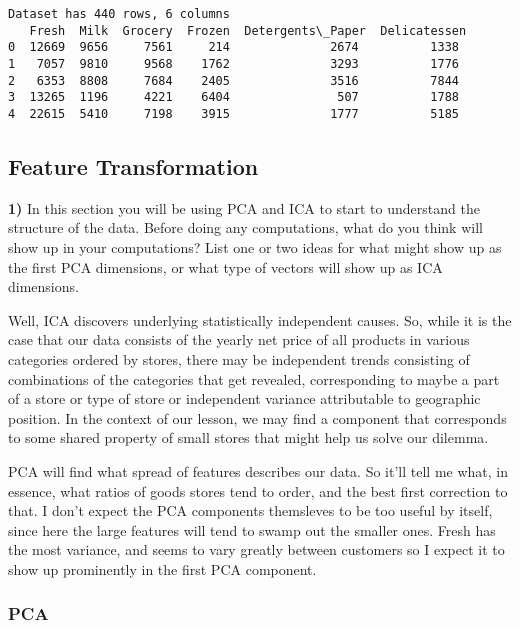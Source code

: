 \documentclass{article}
\begin{document}
    \begin{Verbatim}[commandchars=\\\{\}]
Dataset has 440 rows, 6 columns
   Fresh  Milk  Grocery  Frozen  Detergents\_Paper  Delicatessen
0  12669  9656     7561     214              2674          1338
1   7057  9810     9568    1762              3293          1776
2   6353  8808     7684    2405              3516          7844
3  13265  1196     4221    6404               507          1788
4  22615  5410     7198    3915              1777          5185
    \end{Verbatim}

    \subsection{Feature Transformation}\label{feature-transformation}

    \textbf{1)} In this section you will be using PCA and ICA to start to
understand the structure of the data. Before doing any computations,
what do you think will show up in your computations? List one or two
ideas for what might show up as the first PCA dimensions, or what type
of vectors will show up as ICA dimensions.

    Well, ICA discovers underlying statistically independent causes. So,
while it is the case that our data consists of the yearly net price of
all products in various categories ordered by stores, there may be
independent trends consisting of combinations of the categories that get
revealed, corresponding to maybe a part of a store or type of store or
independent variance attributable to geographic position. In the context
of our lesson, we may find a component that corresponds to some shared
property of small stores that might help us solve our dilemma.

PCA will find what spread of features describes our data. So it'll tell
me what, in essence, what ratios of goods stores tend to order, and the
best first correction to that. I don't expect the PCA components
themsleves to be too useful by itself, since here the large features
will tend to swamp out the smaller ones. Fresh has the most variance,
and seems to vary greatly between customers so I expect it to show up
prominently in the first PCA component.

    \subsubsection{PCA}\label{pca}
\end{document}
